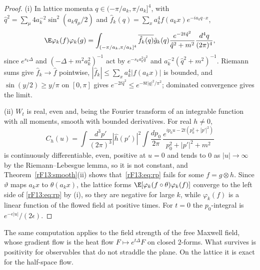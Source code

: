 \begin{proof}
(i) In lattice momenta $q\in(-\pi/a_k,\pi/a_k]^4$, with $\hat q^2=\sum_\mu
4a_k^{-2}\sin^2(a_kq_\mu/2)$ and $\hat f_k(q)=\sum_xa_k^4f(a_kx)e^{-ia_kq\cdot x}$,
\[
\E\varphi_k(f)\varphi_k(g)=\int_{(-\pi/a_k,\pi/a_k]^4}\overline{\hat f_k(q)}
\hat g_k(q)\frac{e^{-2t\hat q^2}}{\hat q^2+m^2}\frac{d^4q}{(2\pi)^4},
\]
since $e^{s_k\Delta}$ and $(-\Delta+m^2a_k^2)^{-1}$ act by $e^{-s_ka_k^2\hat q^2}$
and $a_k^{-2}(\hat q^2+m^2)^{-1}$. Riemann sums give $\hat f_k\to\hat f$
pointwise, $|\hat f_k|\le\sum_xa_k^4|f(a_kx)|$ is bounded, and $\sin(y/2)\ge
y/\pi$ on $[0,\pi]$ gives $e^{-2t\hat q^2}\le e^{-8t|q|^2/\pi^2}$; dominated
convergence gives the limit.

(ii) $W_t$ is real, even and, being the Fourier transform of an integrable
function with all moments, smooth with bounded derivatives. For real $h\ne0$,
\[
C_h(u)=\int\frac{d^3p'}{(2\pi)^3}|\hat h(p')|^2\int\frac{dp_0}{2\pi}\,
\frac{e^{ip_0u-2t(p_0^2+|p'|^2)}}{p_0^2+|p'|^2+m^2}
\]
is continuously differentiable, even, positive at $u=0$ and tends to $0$ as
$|u|\to\infty$ by the Riemann--Lebesgue lemma, so it is not constant, and
Theorem~\ref{rF13:smooth}(ii) shows that~\eqref{rF13:eq:rp} fails for some
$f=g\otimes h$. Since $\vartheta$ maps $a_kx$ to $\theta(a_kx)$, the lattice
forms $\E[\varphi_k(f\circ\theta)\varphi_k(f)]$ converge to the left side of
\eqref{rF13:eq:rp} by (i), so they are negative for large $k$, while
$\varphi_k(f)$ is a linear function of the flowed field at positive times.
For $t=0$ the $p_0$-integral is $e^{-\epsilon|u|}/(2\epsilon)$.
\end{proof}

The same computation applies to the field strength of the free Maxwell field,
whose gradient flow is the heat flow $F\mapsto e^{t\Delta}F$ on closed
$2$-forms. What survives is positivity for observables that do not straddle
the plane. On the lattice it is exact for the half-space flow.

